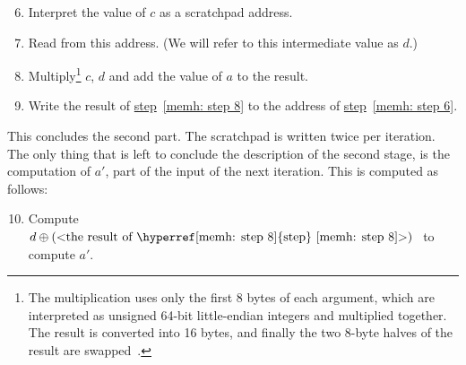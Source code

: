 \begin{enumerate}
  \setcounter{enumi}{5}
  \item \label{memh: step 6} Interpret the value of $c$ as a scratchpad address.
  \item Read from this address. (We will refer to this intermediate value as $d$.)
  \item \label{memh: step 8} Multiply\footnote{The multiplication uses only the first 8 bytes of each argument, which are interpreted as unsigned 64-bit little-endian integers and multiplied together. The result is converted into 16 bytes, and finally the two 8-byte halves of the result are swapped~\cite{cryptonight}.} $c$, $d$ and add the value of $a$ to the result.
  \item Write the result of \hyperref[memh: step 8]{step}~\ref{memh: step 8} to the address of \hyperref[memh: step 6]{step}~\ref{memh: step 6}.
\end{enumerate}
This concludes the second part. The scratchpad is written twice per iteration. The only thing that is left to conclude the description of the second stage, is the computation of $a'$, part of the input of the next iteration. This is computed as follows:

\begin{enumerate}
  \setcounter{enumi}{9}
  \item Compute $d \oplus \mbox{(<the result of \hyperref[memh: step 8]{step}~\ref{memh: step 8}>) }$ to compute $a'$.
\end{enumerate}
\clearpage

